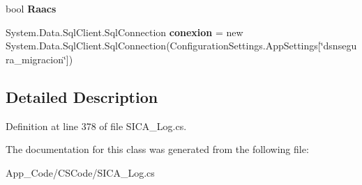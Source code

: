 \begin{DoxyCompactItemize}
\item 
bool {\bfseries Raacs}\hypertarget{class_sica_segura_1_1_s_i_c_a___agrupacion_a88fe7b61505327c9c8f14cb94a6788c0}{}\label{class_sica_segura_1_1_s_i_c_a___agrupacion_a88fe7b61505327c9c8f14cb94a6788c0}

\item 
System.\+Data.\+Sql\+Client.\+Sql\+Connection {\bfseries conexion} = new System.\+Data.\+Sql\+Client.\+Sql\+Connection(Configuration\+Settings.\+App\+Settings\mbox{[}\char`\"{}dsnsegura\+\_\+migracion\char`\"{}\mbox{]})\hypertarget{class_sica_segura_1_1_s_i_c_a___agrupacion_a6160bc79c3695cba87bc9940b296e6e4}{}\label{class_sica_segura_1_1_s_i_c_a___agrupacion_a6160bc79c3695cba87bc9940b296e6e4}

\end{DoxyCompactItemize}


\subsection{Detailed Description}


Definition at line 378 of file S\+I\+C\+A\+\_\+\+Log.\+cs.



The documentation for this class was generated from the following file\+:\begin{DoxyCompactItemize}
\item 
App\+\_\+\+Code/\+C\+S\+Code/S\+I\+C\+A\+\_\+\+Log.\+cs\end{DoxyCompactItemize}
